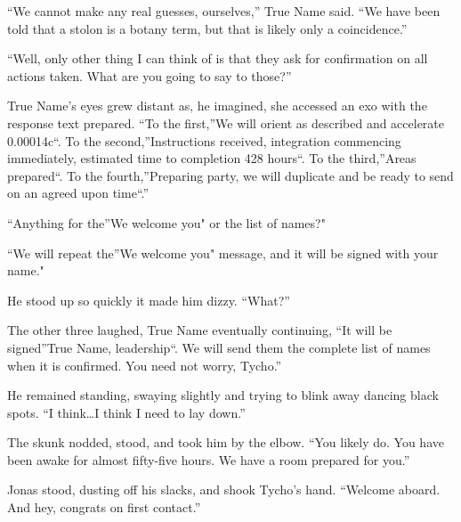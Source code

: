 ``We cannot make any real guesses, ourselves,'' True Name said. ``We have been told that a stolon is a botany term, but that is likely only a coincidence.''

``Well, only other thing I can think of is that they ask for confirmation on all actions taken. What are you going to say to those?''

True Name's eyes grew distant as, he imagined, she accessed an exo with the response text prepared. ``To the first,''We will orient as described and accelerate 0.00014c``. To the second,''Instructions received, integration commencing immediately, estimated time to completion 428 hours``. To the third,''Areas prepared``. To the fourth,''Preparing party, we will duplicate and be ready to send on an agreed upon time``.''

``Anything for the''We welcome you" or the list of names?"

``We will repeat the''We welcome you" message, and it will be signed with your name."

He stood up so quickly it made him dizzy. ``What?''

The other three laughed, True Name eventually continuing, ``It will be signed''True Name, leadership``. We will send them the complete list of names when it is confirmed. You need not worry, Tycho.''

He remained standing, swaying slightly and trying to blink away dancing black spots. ``I think\ldots I think I need to lay down.''

The skunk nodded, stood, and took him by the elbow. ``You likely do. You have been awake for almost fifty-five hours. We have a room prepared for you.''

Jonas stood, dusting off his slacks, and shook Tycho's hand. ``Welcome aboard. And hey, congrats on first contact.''
